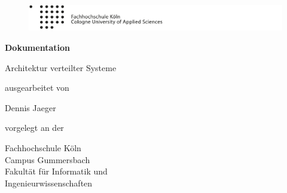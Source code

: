 
\begin{titlepage}

\begin{center}

\begin{figure}[!ht]
	\centering
		\includegraphics[natwidth=920pt, natheight=95pt, width=1.0\textwidth]{images/logoheader.pdf}
\end{figure}

\vspace{0.8cm}

\begin{rmfamily}
\begin{huge}
\textbf{Dokumentation}\\	
\end{huge}
\vspace{0.5cm}
\begin{LARGE}
Architektur verteilter Systeme
\end{LARGE}
\end{rmfamily}

\vspace{1.6cm}


\begin{large}
ausgearbeitet von\\ 
\vspace{0.2cm}
\begin{LARGE}
Dennis Jaeger\\
\end{LARGE}
\end{large}

\vspace{1.0cm}


\begin{large}
vorgelegt an der\\ 
\vspace{0.2cm}
\begin{scshape}
Fachhochschule Köln\\
Campus Gummersbach\\
Fakultät für Informatik und\\
Ingenieurwissenschaften\\
\end{scshape}
\end{large}


\end{center}
\end{titlepage}
